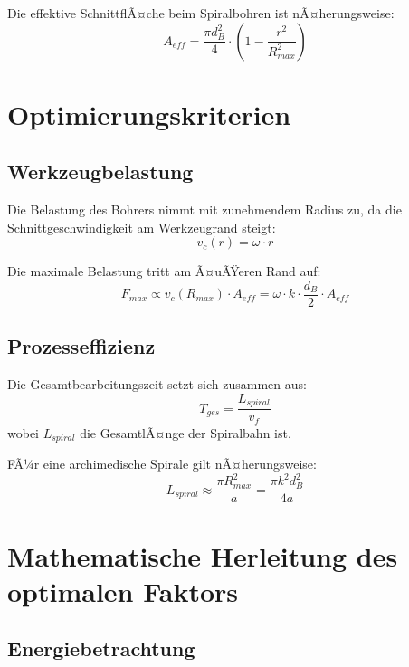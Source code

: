 ﻿\documentclass[12pt,a4paper]{article}
\begin{document}
Die effektive SchnittflÃ¤che beim Spiralbohren ist nÃ¤herungsweise:
\begin{equation}
	A_{eff} = \frac{\pi d_B^2}{4} \cdot \left(1 - \frac{r^2}{R_{max}^2}\right)
\end{equation}

\section{Optimierungskriterien}

\subsection{Werkzeugbelastung}

Die Belastung des Bohrers nimmt mit zunehmendem Radius zu, da die Schnittgeschwindigkeit am Werkzeugrand steigt:
\begin{equation}
	v_c(r) = \omega \cdot r
\end{equation}

Die maximale Belastung tritt am Ã¤uÃŸeren Rand auf:
\begin{equation}
	F_{max} \propto v_c(R_{max}) \cdot A_{eff} = \omega \cdot k \cdot \frac{d_B}{2} \cdot A_{eff}
\end{equation}

\subsection{Prozesseffizienz}

Die Gesamtbearbeitungszeit setzt sich zusammen aus:
\begin{equation}
	T_{ges} = \frac{L_{spiral}}{v_f}
\end{equation}
wobei $L_{spiral}$ die GesamtlÃ¤nge der Spiralbahn ist.

FÃ¼r eine archimedische Spirale gilt nÃ¤herungsweise:
\begin{equation}
	L_{spiral} \approx \frac{\pi R_{max}^2}{a} = \frac{\pi k^2 d_B^2}{4a}
\end{equation}

\section{Mathematische Herleitung des optimalen Faktors}

\subsection{Energiebetrachtung}
\end{document}
